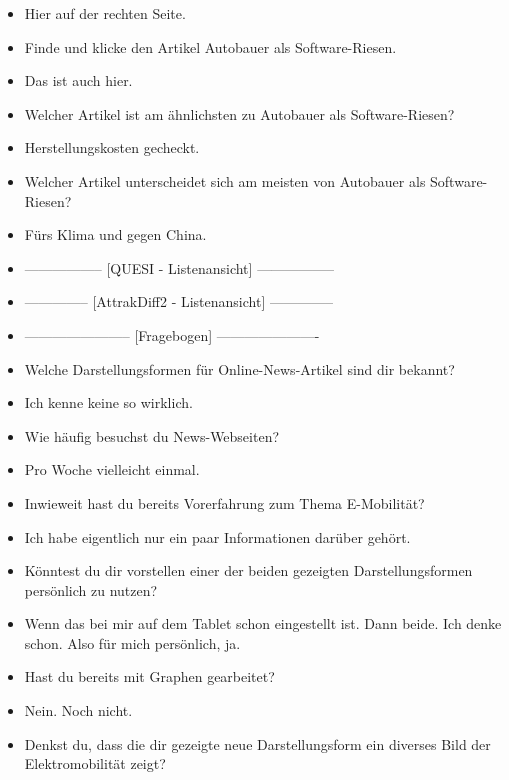 {\begin{itemize}[]
            \item {} Hier auf der rechten Seite.
            \item {} Finde und klicke den Artikel \flqq Autobauer als Software-Riesen\frqq{}.
            \item {} Das ist auch hier.
            \item {} Welcher Artikel ist am ähnlichsten zu \flqq Autobauer als Software-Riesen\frqq{}?
            \item {} \flqq Herstellungskosten gecheckt\frqq{}.
            \item {} Welcher Artikel unterscheidet sich am meisten von \flqq Autobauer als Software-Riesen\frqq{}?
            \item {} \flqq Fürs Klima und gegen China\frqq{}.
            \item {-----------------} [QUESI - Listenansicht] {-----------------}
            \item {--------------} [AttrakDiff2 - Listenansicht] {--------------}
            \item {-----------------------} [Fragebogen] {----------------------}
            \item {} Welche Darstellungsformen für Online-News-Artikel sind dir bekannt?
            \item {} Ich kenne keine so wirklich.
            \item {} Wie häufig besuchst du News-Webseiten?
            \item {} Pro Woche vielleicht einmal.
            \item {} Inwieweit hast du bereits Vorerfahrung zum Thema E-Mobilität?
            \item {} Ich habe eigentlich nur ein paar Informationen darüber gehört.
            \item {} Könntest du dir vorstellen einer der beiden gezeigten Darstellungsformen persönlich zu nutzen?
            \item {} Wenn das bei mir auf dem Tablet schon eingestellt ist.
                  Dann beide.
                  Ich denke schon.
                  Also für mich persönlich, ja.
            \item {} Hast du bereits mit Graphen gearbeitet?
            \item {} Nein. Noch nicht.
            \item {} Denkst du, dass die dir gezeigte neue Darstellungsform ein diverses Bild der Elektromobilität zeigt?

\end{itemize}}
